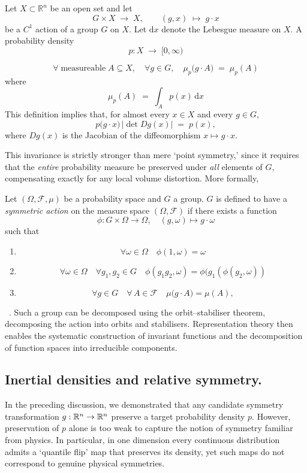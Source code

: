         \begin{definition}
        Let $X\subset\mathbb{R}^n$ be an open set and let 
        \[
            G \times X \;\to\; X,\qquad (g,x)\;\mapsto\;g\cdot x
        \]
        be a $C^1$ action of a group $G$ on $X$. 
        Let $\mathrm{d}x$ denote the Lebesgue measure on $X$.
        A probability density 
        \[
            p : X \;\to\; [0,\infty)
        \]

\[
    \forall \;\text{measureable} \;A \subseteq X,\quad \forall g\in G,\quad
    \mu_p\bigl(g\cdot A\bigr)\;=\;\mu_p(A)
\]
where \[
    \mu_p(A)\;=\;\int_A p(x)\,\mathrm{d}x
    \]
This definition implies that, for almost every $x\in X$ and every $g\in G$,
\[
    p\bigl(g\cdot x\bigr)\,\bigl|\det Dg(x)\bigr|
    \;=\;p(x),
\]
where $Dg(x)$ is the Jacobian of the diffeomorphism $x\mapsto g\cdot x$.
\end{definition}

\noindent
This invariance is strictly stronger than mere `point symmetry,' since it requires that the \emph{entire} probability measure be preserved under \emph{all} elements of $G$, compensating exactly for any local volume distortion. More formally,

\begin{definition}
Let $(\Omega,\mathcal{F},\mu)$ be a probability space and $G$ a group.  \(G\) is defined to have a \emph{symmetric action} on the measure space $(\Omega,\mathcal{F})$ if there exists a function
\[
    \phi: G \times \Omega \to\Omega,\quad (g,\omega)\mapsto g\cdot\omega
\]
such that
\begin{enumerate}
  \item \[\forall\omega \in\Omega\quad\phi(1, \omega) = \omega\]
  \item \[\forall\omega\in\Omega\quad\forall g_1, g_2\in G\quad \phi(g_1g_2, \omega) = \phi(g_1 (\phi (g_2, \omega))\]
  \item 
\[
    \forall g\in G\quad\forall\,A\in\mathcal{F}\quad\mu\bigl(g\cdot A\bigr)=\mu(A),
\]
\end{enumerate}
\end{definition}~\cite{luzzatto_chapter_2006}.
        Such a group can be decomposed using the orbit--stabiliser theorem, decomposing the action into orbits and stabilisers.
        Representation theory then enables the systematic construction of invariant functions and the decomposition of function spaces into irreducible components.
\subsection{Inertial densities and relative symmetry.}
\label{subsec:inertial_densities}
    In the preceding discussion, we demonstrated that any candidate symmetry transformation $g : \mathbb{R}^n \to \mathbb{R}^n$ preserve a target probability density $p$.  However, preservation of $p$ alone is too weak to capture the notion of symmetry familiar from physics.  In particular, in one dimension every continuous distribution admits a `quantile flip' map that preserves its density, yet such maps do not correspond to genuine physical symmetries.
